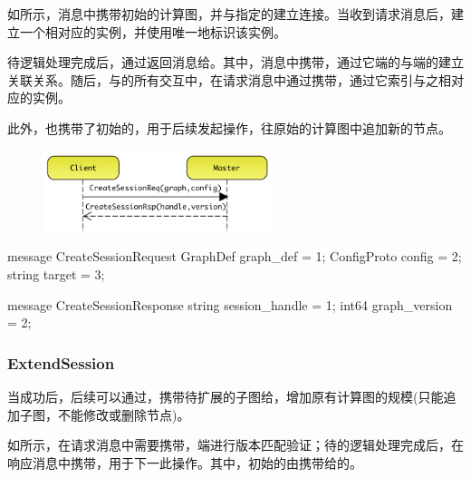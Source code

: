 \begin{content}
\begin{content}
如所示，消息中携带初始的计算图，并与指定的建立连接。当收到请求消息后，建立一个相对应的实例，并使用唯一地标识该实例。

待逻辑处理完成后，通过返回消息给。其中，消息中携带，通过它端的与端的建立关联关系。随后，与的所有交互中，在请求消息中通过携带，通过它索引与之相对应的实例。

此外，也携带了初始的，用于后续发起操作，往原始的计算图中追加新的节点。

\begin{figure}[H]
\centering
\includegraphics[width=0.6\textwidth]{figures/dist-ms-create-sess-req.png}
\caption{}
 \label{fig:dist-ms-create-sess-req}
\end{figure}

\begin{leftbar}
\begin{c++}
message CreateSessionRequest {
  GraphDef graph_def = 1;
  ConfigProto config = 2;
  string target = 3;
}

message CreateSessionResponse {
  string session_handle = 1;
  int64 graph_version = 2;
}
\end{c++}
\end{leftbar}

\subsubsection{ExtendSession}

当成功后，后续可以通过，携带待扩展的子图给，增加原有计算图的规模(只能追加子图，不能修改或删除节点)。

如所示，在请求消息中需要携带，端进行版本匹配验证；待的逻辑处理完成后，在响应消息中携带，用于下一此操作。其中，初始的由携带给的。


\end{content}
\end{content}
